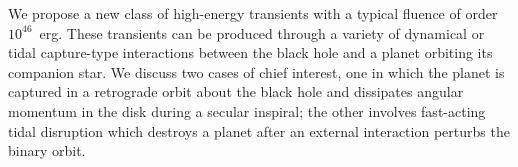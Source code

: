 We propose a new class of high-energy transients with a typical
  fluence of order $10^{46}$~erg.  These transients can be produced
  through a variety of dynamical or tidal capture-type interactions
  between the black hole and a planet orbiting its companion star.  We
  discuss two cases of chief interest, one in which the planet is
  captured in a retrograde orbit about the black hole and dissipates
  angular momentum in the disk during a secular inspiral; the other
  involves fast-acting tidal disruption which destroys a planet after
  an external interaction perturbs the binary orbit.
  
  

